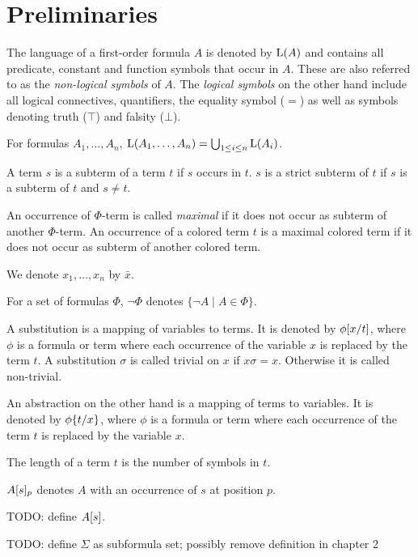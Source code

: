 \section{Preliminaries}

The language of a first-order formula $A$ is denoted by $\operatorname{L}(A)$ and contains all predicate, constant and function symbols that occur in $A$.
These are also referred to as the \emph{\mbox{non-logical} symbols} of $A$.
The \emph{logical symbols} on the other hand include all logical connectives, quantifiers, the equality symbol ($=$) as well as symbols denoting truth ($\top$) and falsity ($\bot$).

For formulas $A_1, \ldots, A_n$, $\operatorname{L}(A_1, \ldots, A_n) = \bigcup_{1\leq i \leq n} \operatorname{L}(A_i)$.

A term $s$ is a subterm of a term $t$ if $s$ occurs in $t$. $s$ is a strict subterm of $t$ if $s$ is a subterm of $t$ and $s \neq t$.

An occurrence of $\Phi$-term is called \emph{maximal} if it does not occur as subterm of another $\Phi$-term.
An occurrence of a colored term $t$ is a maximal colored term if it does not occur as subterm of another colored term.

We denote $x_1, \ldots, x_n$ by $\bar x$.

For a set of formulas $\Phi$, $\lnot \Phi$ denotes $\{\lnot A \mid A \in \Phi\}$.

A substitution is a mapping of variables to terms. It is denoted by $\phi[x/t]$, where $\phi$ is a formula or term where each occurrence of the variable $x$ is replaced by the term $t$.
A substitution $\sigma$ is called trivial on $x$ if $x\sigma = x$. Otherwise it is called non-trivial.

An abstraction on the other hand is a mapping of terms to variables. It is denoted by $\phi\{t/x\}$, where $\phi$ is a formula or term where each occurrence of the term $t$ is replaced by the variable $x$.

The length of a term $t$ is the number of symbols in $t$.

$A{[s]_{p}}$ denotes $A$ with an occurrence of $s$ at position $p$.

TODO: define $A[s]$.

TODO: define $\Sigma$ as subformula set; possibly remove definition in chapter 2

